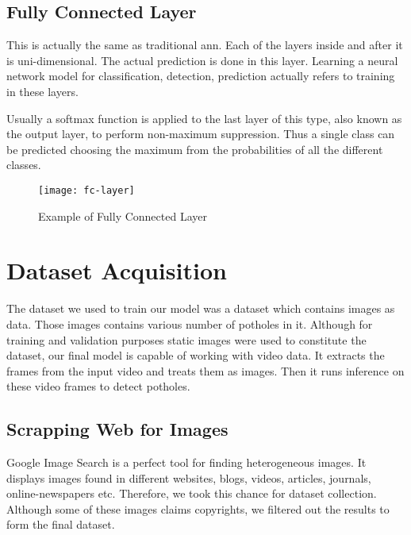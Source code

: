         \subsection{Fully Connected Layer}
            This is actually the same as traditional \acrfull{ann}. Each of the layers inside and after it is uni-dimensional\cite{schwing2015fully}. The actual prediction is done in this layer. Learning a neural network model for classification, detection, prediction actually refers to training in these layers\cite{schwing2015fully}.
            
            Usually a softmax function is applied to the last layer of this type, also known as the output layer, to perform non-maximum suppression\cite{schwing2015fully}. Thus a single class can be predicted choosing the maximum from the probabilities of all the different classes.
            \begin{figure}[h]
                \centering
                \texttt{[image: fc-layer]}
                \caption{Example of Fully Connected Layer}
                \label{fig:fc-layer}
            \end{figure}
        
    \clearpage
    
    \section{Dataset Acquisition}
        The dataset we used to train our model was a dataset which contains images as data. Those images contains various number of potholes in it. Although for training and validation purposes static images were used to constitute the dataset, our final model is capable of working with video data. It extracts the frames from the input video and treats them as images. Then it runs inference on these video frames to detect potholes.
        
        \subsection{Scrapping Web for Images}
            Google Image Search is a perfect tool for finding heterogeneous images\cite{fergus2005learning}. It displays images found in different websites, blogs, videos, articles, journals, online-newspapers etc. Therefore, we took this chance for dataset collection. Although some of these images claims copyrights, we filtered out the results to form the final dataset.
            
